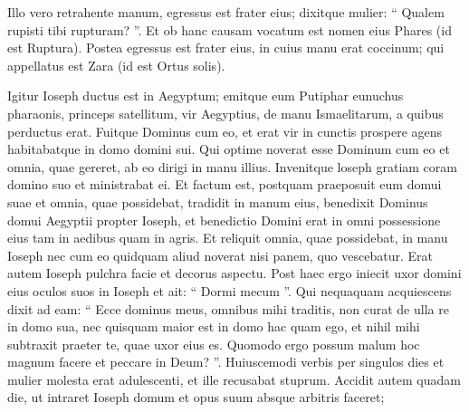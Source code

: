 \begin{biblechapter}
\begin{biblechapter}
\begin{biblechapter}
\begin{biblechapter}
\begin{biblechapter}
\begin{biblechapter}
\begin{biblechapter}
\begin{biblechapter}
\begin{biblechapter}
\begin{biblechapter}
\begin{biblechapter}
\begin{biblechapter}
\begin{biblechapter}
\begin{biblechapter}
\begin{biblechapter}
\begin{biblechapter}
\begin{biblechapter}
\begin{biblechapter}
\begin{biblechapter}
\begin{biblechapter}
\begin{biblechapter}
\begin{biblechapter}
\begin{biblechapter}
\begin{biblechapter}
\begin{biblechapter}
\begin{biblechapter}
\begin{biblechapter}
\begin{biblechapter}
\begin{biblechapter}
\begin{biblechapter}
\begin{biblechapter}
\begin{biblechapter}
\begin{biblechapter}
\begin{biblechapter}
\begin{biblechapter}
\begin{biblechapter}
\begin{biblechapter}
\begin{biblechapter}
\verse Illo vero retrahente manum, egressus est frater eius; dixitque mulier: “ Qualem rupisti tibi rupturam? ”. Et ob hanc causam vocatum est nomen eius Phares (id est Ruptura). 
\verse Postea egressus est frater eius, in cuius manu erat coccinum; qui appellatus est Zara (id est Ortus solis).
 
\begin{biblechapter}
\verse Igitur Ioseph ductus est in Aegyptum; emitque eum Putiphar eunuchus pharaonis, princeps satellitum, vir Aegyptius, de manu Ismaelitarum, a quibus perductus erat. 
\verse Fuitque Dominus cum eo, et erat vir in cunctis prospere agens habitabatque in domo domini sui. 
\verse Qui optime noverat esse Dominum cum eo et omnia, quae gereret, ab eo dirigi in manu illius. 
\verse Invenitque loseph gratiam coram domino suo et ministrabat ei. Et factum est, postquam praeposuit eum domui suae et omnia, quae possidebat, tradidit in manum eius, 
\verse benedixit Dominus domui Aegyptii propter Ioseph, et benedictio Domini erat in omni possessione eius tam in aedibus quam in agris. 
\verse Et reliquit omnia, quae possidebat, in manu Ioseph nec cum eo quidquam aliud noverat nisi panem, quo vescebatur. Erat autem Ioseph pulchra facie et decorus aspectu.
 \verse Post haec ergo iniecit uxor domini eius oculos suos in Ioseph et ait: “ Dormi mecum ”. 
\verse Qui nequaquam acquiescens dixit ad eam: “ Ecce dominus meus, omnibus mihi traditis, non curat de ulla re in domo sua, 
\verse nec quisquam maior est in domo hac quam ego, et nihil mihi subtraxit praeter te, quae uxor eius es. Quomodo ergo possum malum hoc magnum facere et peccare in Deum? ”. 
 \verse Huiuscemodi verbis per singulos dies et mulier molesta erat adulescenti, et ille recusabat stuprum.
 \verse Accidit autem quadam die, ut intraret Ioseph domum et opus suum absque arbitris faceret; 

\end{biblechapter}
\end{biblechapter}
\end{biblechapter}
\end{biblechapter}
\end{biblechapter}
\end{biblechapter}
\end{biblechapter}
\end{biblechapter}
\end{biblechapter}
\end{biblechapter}
\end{biblechapter}
\end{biblechapter}
\end{biblechapter}
\end{biblechapter}
\end{biblechapter}
\end{biblechapter}
\end{biblechapter}
\end{biblechapter}
\end{biblechapter}
\end{biblechapter}
\end{biblechapter}
\end{biblechapter}
\end{biblechapter}
\end{biblechapter}
\end{biblechapter}
\end{biblechapter}
\end{biblechapter}
\end{biblechapter}
\end{biblechapter}
\end{biblechapter}
\end{biblechapter}
\end{biblechapter}
\end{biblechapter}
\end{biblechapter}
\end{biblechapter}
\end{biblechapter}
\end{biblechapter}
\end{biblechapter}
\end{biblechapter}
